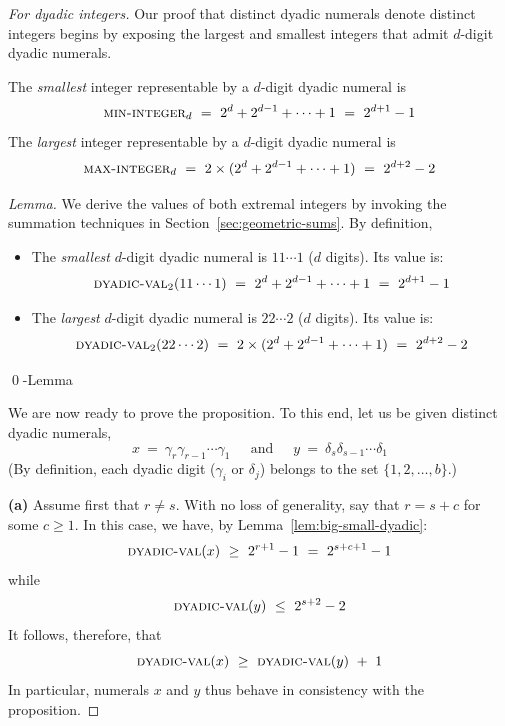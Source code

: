 \begin{proof}[For dyadic integers]
Our proof that distinct dyadic numerals denote distinct integers begins by exposing the largest and smallest integers that admit $d$-digit dyadic numerals.

\begin{lemma}
\label{lem:big-small-dyadic}
The {\em smallest} integer representable by a $d$-digit dyadic numeral is 
\[ \mbox{\sc min-integer}_d \ = \ 2^d + 2^{d-1} + \cdots + 1 \ = \ 2^{d+1} - 1 \]
The {\em largest} integer representable by a $d$-digit dyadic numeral is
\[ \mbox{\sc max-integer}_d \ = \ 2 \times (2^d + 2^{d-1} + \cdots + 1) \ = \ 2^{d+2} - 2 \]
\end{lemma}

\begin{proof}[Lemma]
We derive the values of both extremal integers by invoking the summation techniques in Section~\ref{sec:geometric-sums}.  By definition,
\begin{itemize}
\item
The {\em smallest} $d$-digit dyadic numeral is $11 \cdots 1$ ($d$ digits).  Its value is:
\[ \mbox{\sc dyadic-val}_2(11 \cdots 1)
 \ = \ 2^d + 2^{d-1} + \cdots + 1 \ = \ 2^{d+1} - 1 \]
\medskip\item
The {\em largest} $d$-digit dyadic numeral is  $22 \cdots 2$ ($d$ digits).  Its value is:
\[ \mbox{\sc dyadic-val}_2(22 \cdots 2)
\ = \ 2 \times (2^d + 2^{d-1} + \cdots + 1) \ = \ 2^{d+2} - 2 \]
\end{itemize}
\qed-Lemma
\end{proof}

\bigskip

We are now ready to prove the proposition.  To this end, let us be given distinct dyadic numerals,
\[
x \ = \ \gamma_r \gamma_{r-1} \cdots \gamma_1
 \ \ \ \ \ \mbox{ and } \ \ \ \ \
y \ = \ \delta_s \delta_{s-1} \cdots \delta_1
\]
(By definition, each dyadic digit ($\gamma_i$ or $\delta_j$) belongs to the set $\{1, 2, \ldots, b\}$.)

\smallskip

{\bf (a)} Assume first that $r \neq s$.  With no loss of generality, say that $r = s +c$ for some $c \geq 1$.  In this case, we have, by Lemma~\ref{lem:big-small-dyadic}:
\[ \mbox{\sc dyadic-val}(x) \ \geq \ 2^{r+1} - 1 \ = \ 2^{s+c+1} -1 \]
while
\[ \mbox{\sc dyadic-val}(y) \ \leq \ 2^{s+2} - 2 \]
It follows, therefore, that
\[ \mbox{\sc dyadic-val}(x) \ \geq \ \mbox{\sc dyadic-val}(y) \ + \ 1 \]
In particular, numerals $x$ and $y$ thus behave in consistency with the proposition.


\end{proof}
